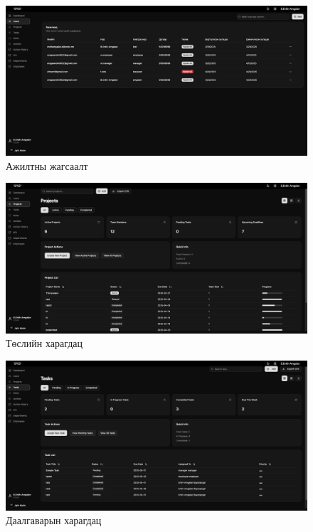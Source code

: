 \begin{figure}[H]
    \centering
    \includegraphics[scale=0.25]{src/images/uiux/listEmp.png}
    \caption{Ажилтны жагсаалт}
    \label{fig:list_emp_page}
\end{figure}

\begin{figure}[H]
    \centering
    \includegraphics[scale=0.25]{src/images/uiux/proj.png}
    \caption{Төслийн харагдац}
    \label{fig:proj_page}
\end{figure}

\begin{figure}[H]
    \centering
    \includegraphics[scale=0.25]{src/images/uiux/task.png}
    \caption{Даалгаварын харагдац}
    \label{fig:task_page}
\end{figure}

